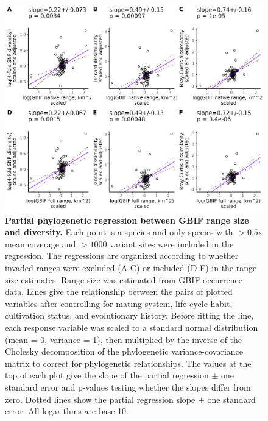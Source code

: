 \documentclass[12pt]{article}
\begin{document}
\begin{figure}[H]
    \centering
    \includegraphics[width=\textwidth]{figures/appendix_d/gbif_area_vs_diversity_corrected_2024-12-12.jpg}
    \caption{\textbf{Partial phylogenetic regression between GBIF range size and diversity.} Each point is a species and only species with $>0.5$x mean coverage and $>1000$ variant sites were included in the regression. The regressions are organized according to whether invaded ranges were excluded (A-C) or included (D-F) in the range size estimates. Range size was estimated from GBIF occurrence data. Lines give the relationship between the pairs of plotted variables after controlling for mating system, life cycle habit, cultivation status, and evolutionary history. Before fitting the line, each response variable was scaled to a standard normal distribution (mean = 0, variance = 1), then multiplied by the inverse of the Cholesky decomposition of the phylogenetic variance-covariance matrix to correct for phylogenetic relationships. The values at the top of each plot give the slope of the partial regression $\pm$ one standard error and p-values testing whether the slopes differ from zero. Dotted lines show the partial regression slope $\pm$ one standard error. All logarithms are base 10.}
\end{figure}
\end{document}
